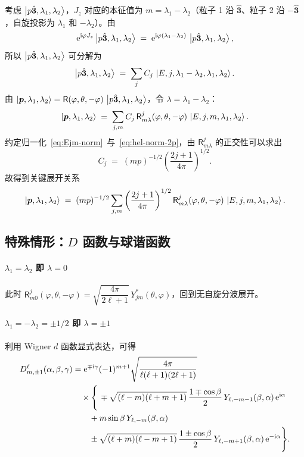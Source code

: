 考虑 $\ket{p\hat{\bm 3},\lambda_1,\lambda_2}$，$J_z$ 对应的本征值为 $m=\lambda_1-\lambda_2$（粒子 1 沿 $\hat{\bm 3}$、粒子 2 沿 $-\hat{\bm 3}$，自旋投影为 $\lambda_1$ 和 $-\lambda_2$）。由
\[
  \mathrm{e}^{\mathrm{i}\varphi J_z}\ket{p\hat{\bm 3},\lambda_1,\lambda_2}
  \;=\; \mathrm{e}^{\mathrm{i}\varphi(\lambda_1-\lambda_2)}\,\ket{p\hat{\bm 3},\lambda_1,\lambda_2},
\]
所以 $\ket{p\hat{\bm 3},\lambda_1,\lambda_2}$ 可分解为
\begin{equation}
  \ket{p\hat{\bm 3},\lambda_1,\lambda_2} \;=\; \sum_j C_j\,\ket{E,j,\lambda_1-\lambda_2,\lambda_1,\lambda_2}.
  \label{eq:phat3-expand}
\end{equation}
由 $\ket{\bm p,\lambda_1,\lambda_2}=\mathsf{R}(\varphi,\theta,-\varphi)\,\ket{p\hat{\bm 3},\lambda_1,\lambda_2}$，令 $\lambda=\lambda_1-\lambda_2$：
\begin{equation}
  \ket{\bm p,\lambda_1,\lambda_2} \;=\; \sum_{j,m} C_j\,\mathsf{R}^{j}_{m\lambda}(\varphi,\theta,-\varphi)\,\ket{E,j,m,\lambda_1,\lambda_2}.
  \label{eq:p-expand}
\end{equation}
约定归一化~\eqref{eq:Ejm-norm}~与~\eqref{eq:hel-norm-2p}，由 $\mathsf{R}^{j}_{m\lambda}$ 的正交性可以求出
\begin{equation}
  C_j \;=\; (mp)^{-1/2}\left(\frac{2j+1}{4\pi}\right)^{1/2}.
  \label{eq:Cj}
\end{equation}
故得到关键展开关系
\begin{equation}
  \ket{\bm p,\lambda_1,\lambda_2}
  \;=\; (mp)^{-1/2}\sum_{j,m}\left(\frac{2j+1}{4\pi}\right)^{1/2}
        \mathsf{R}^{j}_{m\lambda}(\varphi,\theta,-\varphi)\,\ket{E,j,m,\lambda_1,\lambda_2}.
  \label{eq:p-Ejm-expand}
\end{equation}

\subsection{特殊情形：$D$ 函数与球谐函数}

\paragraph{$\lambda_1=\lambda_2$ 即 $\lambda=0$} 此时 $\mathsf{R}^{j}_{m0}(\varphi,\theta,-\varphi)=\sqrt{\dfrac{4\pi}{2\ell+1}}\,Y^*_{jm}(\theta,\varphi)$，回到无自旋分波展开。

\paragraph{$\lambda_1=-\lambda_2=\pm 1/2$ 即 $\lambda=\pm 1$} 利用 Wigner $d$ 函数显式表达，可得
\begin{align}
  D^{\ell}_{m,\pm 1}(\alpha,\beta,\gamma)
  &= \mathrm{e}^{\mp\mathrm{i}\gamma}(-1)^{m+1}\sqrt{\frac{4\pi}{\ell(\ell+1)(2\ell+1)}} \notag\\
  &\quad\times\Bigg\{\,\mp\sqrt{(\ell-m)(\ell+m+1)}\,\frac{1\mp\cos\beta}{2}\,Y_{\ell,-m-1}(\beta,\alpha)\,\mathrm{e}^{\mathrm{i}\alpha} \notag\\
  &\qquad + m\sin\beta\,Y_{\ell,-m}(\beta,\alpha) \notag\\
  &\qquad \pm \sqrt{(\ell+m)(\ell-m+1)}\,\frac{1\pm\cos\beta}{2}\,Y_{\ell,-m+1}(\beta,\alpha)\,\mathrm{e}^{-\mathrm{i}\alpha}\Bigg\}.
  \label{eq:Dlmpm1}
\end{align}

